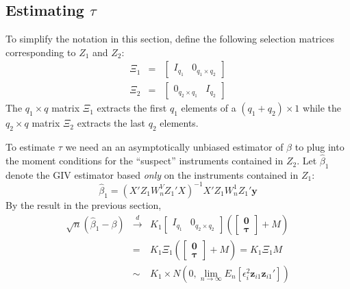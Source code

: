 \documentclass[12pt]{article}
\theoremstyle{definition}
\begin{document}
\subsection{Estimating $\tau$}
To simplify the notation in this section, define the following selection matrices corresponding to $Z_1$ and $Z_2$: 
  \begin{eqnarray*}
  \Xi_1 &=& \left[\begin{array}{cc} I_{q_1} & 0_{q_1 \times q_2}  \end{array}\right]\\
    \Xi_2 &=& \left[ \begin{array}{cc}
              0_{q_2 \times q_1}& I_{q_2}
            \end{array}\right]
  \end{eqnarray*}
The $q_1\times q$ matrix $\Xi_1$ extracts the first $q_1$ elements of a $(q_1 + q_2)\times 1$ while the $q_2\times q$ matrix $\Xi_2$ extracts the last $q_2$ elements. 

To estimate $\tau$ we need an an asymptotically unbiased estimator of $\beta$ to plug into the moment conditions for the ``suspect'' instruments contained in $Z_2$. 
Let $\widehat{\beta}_1$ denote the GIV estimator based \emph{only} on the instruments contained in $Z_1$:
\begin{equation}
  \widehat{\beta}_1 = \left(X'Z_1 W^V_n Z_1' X\right)^{-1} X'Z_1 W_n^1 Z_1' \mathbf{y}
\end{equation}
By the result in the previous section,
  \begin{eqnarray*}
    \sqrt{n} \left(\widehat{\beta}_1 - \beta \right) &\overset{d}{\rightarrow}& K_1 \left[\begin{array}{cc} I_{q_1} & 0_{q_2 \times q_2}  \end{array}\right] \left(\left[\begin{array}
           {c} \mathbf{0} \\ \boldsymbol{\tau}
         \end{array}\right] + M \right)\\
         &=& K_1 \Xi_1  \left(\left[\begin{array}
           {c} \mathbf{0} \\ \boldsymbol{\tau}
         \end{array}\right] + M \right) = K_1 \Xi_1 M\\
          &\sim& K_1  \times N\left(0, \lim_{n\rightarrow \infty} E_n[\epsilon_i^2 \mathbf{z}_{i1}\mathbf{z}_{i1}']\right)
  \end{eqnarray*}
\end{document}
